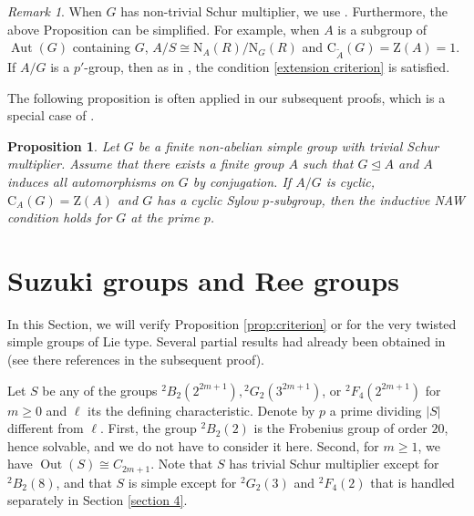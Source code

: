 \documentclass[11pt,a4paper]{article}
\numberwithin{equation}{section}
\newtheorem{proposition}[theorem]{Proposition}
\theoremstyle{definition}
\theoremstyle{remark}
\newtheorem{remark}[theorem]{Remark}
\newcommand{\Aut}{\operatorname{Aut}}
\newcommand{\Out}{\operatorname{Out}}
\newcommand{\ZZ}{\mathrm{Z}}
\newcommand{\NN}{\mathrm N}
\newcommand{\CC}{\mathrm C}
\begin{document}
\begin{remark}\label{rem: 2.2}
When  \(G\) has non-trivial Schur multiplier, we use \cite[Proposition 9.1]{FFZ}. Furthermore, the above Proposition can be simplified. For example, when $A$ is a subgroup of $\Aut(G)$ containing $G$, $A/S\cong \NN_A(R)/\NN_{G}(R)$ and  $\CC_{\widetilde A}(G)=\ZZ(A)=1$.  If $A/G$ is a $p'$-group, then as in \cite[Remark 9.2]{FFZ}, the condition \eqref{extension criterion} is satisfied.
\end{remark}
The following proposition is often applied in our subsequent proofs, which is a special case of {\cite[Corollary 10.4]{FFZ}}.
\begin{proposition}\label{cyclic Sylow}
Let $G$ be a finite non-abelian simple group  with trivial Schur multiplier.  Assume that there exists a finite group $A$ such that $G\unlhd A$ and $A$ induces all automorphisms on $G$ by conjugation. 
If $A/G$ is cyclic, $\CC_A(G)=\ZZ(A)$ and $G$ has a cyclic Sylow $p$-subgroup, then the inductive NAW condition holds for $G$ at the prime $p$.
\end{proposition}



\section{Suzuki groups and Ree groups}\label{section 3}
In this Section, we will verify Proposition \ref{prop:criterion} or \cite[Proposition 9.1]{FFZ}  for the very twisted simple groups of Lie type. Several partial results had already been obtained in \cite{FFZ} (see there references in the subsequent proof).

Let $S$ be any of the groups ${}^2B_2(2^{2m+1}), {}^2G_2(3^{2m+1})$, or ${}^2F_4(2^{2m+1})$ for $m\geq 0$ and $\ell$ its the defining characteristic. Denote by $p$ a prime dividing $|S|$ different from $\ell$.  First, the group ${}^2B_2(2)$ is the Frobenius group of order $20$, hence solvable, and we do not have to consider it here. Second, for $m\geq 1$, we have $\Out(S)\cong C_{2m+1}$.
Note that $S$ has trivial Schur multiplier except for ${}^2B_2(8)$, and that $S$ is simple except for \({}^2G_2(3)\) and \({}^2F_4(2)\) that is handled separately  in Section \ref{section 4}.
\end{document}
